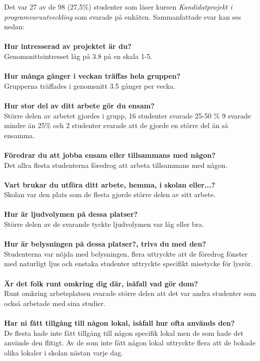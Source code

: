 Det var 27 av de 98 (27,5\%) studenter som läser kursen \textit{Kandidatprojekt i programvaruutveckling} som svarade på enkäten. Sammanfattade svar kan ses nedan:\\
\\\textbf{Hur intresserad av projektet är du?}\\ 
Genomsnittsintresset låg på 3.8 på en skala 1-5.\\\\
\textbf{Hur många gånger i veckan träffas hela gruppen?}\\
Grupperna träffades i genomsnitt 3.5 gånger per vecka.\\\\
\textbf{Hur stor del av ditt arbete gör du ensam?}\\
Större delen av arbetet gjordes i grupp, 16 studenter svarade 25-50 \% 9 svarade  mindre än 25\% och 2 studenter svarade att de gjorde en större del än så ensamma.\\\\
\textbf{Föredrar du att jobba ensam eller tillsammans med någon?}\\
Det allra flesta studenterna föredrog att arbeta tillsammans med någon.\\\\
\textbf{Vart brukar du utföra ditt arbete, hemma, i skolan eller...?}\\
Skolan var den plats som de flesta gjorde större delen av sitt arbete. \\\\
\textbf{Hur är ljudvolymen på dessa platser?}\\
Större delen av de svarande tyckte ljudvolymen var låg eller bra.\\\\
\textbf{Hur är belysningen på dessa platser?, trivs du med den?}\\
Studenterna var nöjda med belysningen, flera uttryckte att de föredrog fönster med naturligt ljus och enstaka studenter uttryckte specifikt misstycke för lysrör.\\\\
\textbf{Är det folk runt omkring dig där, isåfall vad gör dom?}\\
Runt omkring arbetsplatsen svarade större delen att det var andra studenter som också arbetade med sina studier.\\\\
\textbf{Har ni fått tillgång till någon lokal, isåfall hur ofta används den?}\\
De flesta hade inte fått tillgång till någon specifik lokal men de som hade det använde den flitigt. Av de som inte fått någon lokal uttryckte flera att de bokade olika lokaler i skolan nästan varje dag.\\\\

